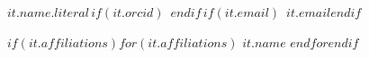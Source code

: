 $it.name.literal$\,$if(it.orcid)$~$endif$\,$if(it.email)$~\textit{$it.email$}$endif$

$if(it.affiliations)$$for(it.affiliations)$
{\small $it.name$}\newline
$endfor$$endif$